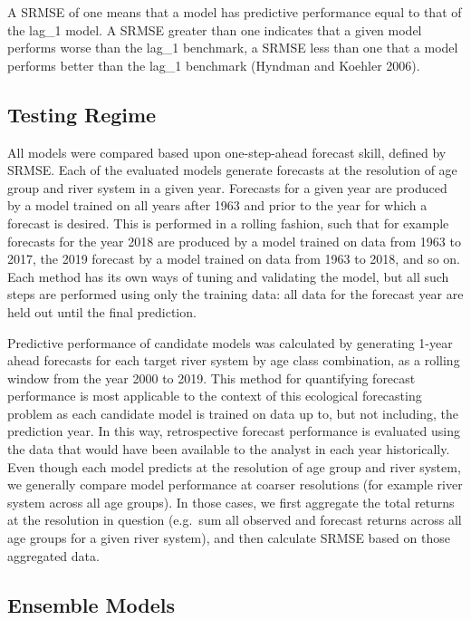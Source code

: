 \documentclass[
]{article}
\begin{document}
A SRMSE of one means that a model has predictive performance equal to that of the lag\_1 model. A SRMSE greater than one indicates that a given model performs worse than the lag\_1 benchmark, a SRMSE less than one that a model performs better than the lag\_1 benchmark (Hyndman and Koehler 2006).

\hypertarget{testing-regime}{%
\subsection*{Testing Regime}\label{testing-regime}}

All models were compared based upon one-step-ahead forecast skill, defined by SRMSE. Each of the evaluated models generate forecasts at the resolution of age group and river system in a given year. Forecasts for a given year are produced by a model trained on all years after 1963 and prior to the year for which a forecast is desired. This is performed in a rolling fashion, such that for example forecasts for the year 2018 are produced by a model trained on data from 1963 to 2017, the 2019 forecast by a model trained on data from 1963 to 2018, and so on. Each method has its own ways of tuning and validating the model, but all such steps are performed using only the training data: all data for the forecast year are held out until the final prediction.

Predictive performance of candidate models was calculated by generating 1-year ahead forecasts for each target river system by age class combination, as a rolling window from the year 2000 to 2019. This method for quantifying forecast performance is most applicable to the context of this ecological forecasting problem as each candidate model is trained on data up to, but not including, the prediction year. In this way, retrospective forecast performance is evaluated using the data that would have been available to the analyst in each year historically. Even though each model predicts at the resolution of age group and river system, we generally compare model performance at coarser resolutions (for example river system across all age groups). In those cases, we first aggregate the total returns at the resolution in question (e.g.~sum all observed and forecast returns across all age groups for a given river system), and then calculate SRMSE based on those aggregated data.

\hypertarget{ensemble-models}{%
\subsection*{Ensemble Models}\label{ensemble-models}}
\end{document}
